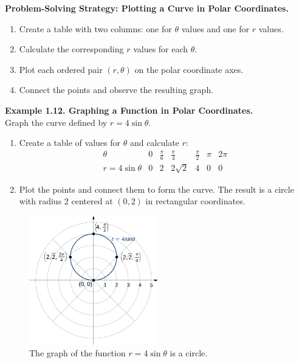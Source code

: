 \documentclass{article}
\begin{document}
\begin{conceptbox}
\textbf{Problem-Solving Strategy: Plotting a Curve in Polar Coordinates.}
\begin{enumerate}
    \item Create a table with two columns: one for $\theta$ values and one for $r$ values.
    \item Calculate the corresponding $r$ values for each $\theta$.
    \item Plot each ordered pair $(r, \theta)$ on the polar coordinate axes.
    \item Connect the points and observe the resulting graph.
\end{enumerate}
\end{conceptbox}

\begin{examplebox}
\textbf{Example 1.12. Graphing a Function in Polar Coordinates.} \\
Graph the curve defined by $r = 4\sin\theta$.  
\begin{enumerate}
    \item Create a table of values for $\theta$ and calculate $r$:
    \[
    \begin{array}{c|c|c|c|c|c|c}
    \theta & 0 & \frac{\pi}{6} & \frac{\pi}{4} & \frac{\pi}{2} & \pi & 2\pi \\
    \hline
    r = 4\sin\theta & 0 & 2 & 2\sqrt{2} & 4 & 0 & 0
    \end{array}
    \]
    \item Plot the points and connect them to form the curve. The result is a circle with radius $2$ centered at $(0, 2)$ in rectangular coordinates.
\end{enumerate}
\begin{figure}[H]
    \centering
    \includegraphics[width=0.5\textwidth]{rEquals4sinTheta.png}
    \caption{The graph of the function \( r = 4\sin\theta \) is a circle.}
    \label{fig:sample_image}
\end{figure}
\end{examplebox}
\end{document}

